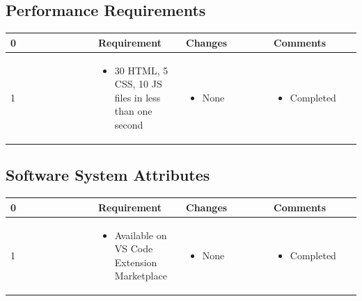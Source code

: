 \documentclass[letterpaper,10pt,titlepage,draftclsnofoot,onecolumn,onesided] {IEEEtran}
\begin{document}
\subsection{Performance Requirements}
\small{
\begin{center}
	\begin{singlespace}
		\begin{tabular}{ |  p{0.25\linewidth}  |  p{0.25\linewidth}  | p{0.25\linewidth} | p{0.25\linewidth} |}
		\hline
		0 & Requirement & Changes & Comments \\ \hline
		
			1
		& 
			\begin{itemize}
				\item 30 HTML, 5 CSS, 10 JS files in less than one second
			\end{itemize}
		& 
			\begin{itemize}
				\item None
			\end{itemize}
		&
			\begin{itemize}
				\item Completed
			\end{itemize} 
		
        \\ \hline

		\end{tabular}
	\end{singlespace}
\end{center}
}


\subsection{Software System Attributes}
\small{
\begin{center}
	\begin{singlespace}
		\begin{tabular}{ |  p{0.25\linewidth}  |  p{0.25\linewidth}  | p{0.25\linewidth} | p{0.25\linewidth} |}
		\hline
		0 & Requirement & Changes & Comments \\ \hline
		
			1
		& 
			\begin{itemize}
				\item Available on VS Code Extension Marketplace
			\end{itemize}
		& 
			\begin{itemize}
				\item None
			\end{itemize}
		&
			\begin{itemize}
				\item Completed
			\end{itemize} 
		
        \\ \hline

		\end{tabular}
	\end{singlespace}
\end{center}
}
\end{document}

